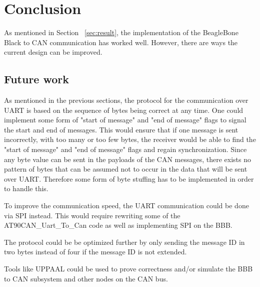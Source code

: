 
\section{Conclusion}\label{sec:conclusion}
As mentioned in Section ~\ref{sec:result}, the implementation of the BeagleBone Black to CAN communication has worked well. However, there are ways the current design can be improved.

\subsection{Future work}
As mentioned in the previous sections, the protocol for the communication over UART is based on the sequence of bytes being correct at any time. One could implement some form of "start of message" and "end of message" flags to signal the start and end of messages. This would ensure that if one message is sent incorrectly, with too many or too few bytes, the receiver would be able to find the "start of message" and "end of message" flags and regain synchronization. \newline
Since any byte value can be sent in the payloads of the CAN messages, there exists no pattern of bytes that can be assumed not to occur in the data that will be sent over UART. Therefore some form of byte stuffing has to be implemented in order to handle this.

To improve the communication speed, the UART communication could be done via SPI instead. This would require rewriting some of the AT90CAN\_Uart\_To\_Can code as well as implementing SPI on the BBB.

The protocol could be be optimized further by only sending the message ID in two bytes instead of four if the message ID is not extended.

Tools like UPPAAL could be used to prove correctness and/or simulate the BBB to CAN subsystem and other nodes on the CAN bus.
